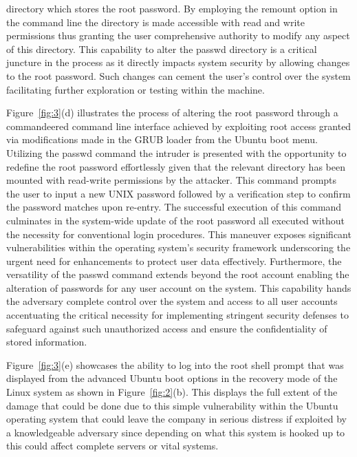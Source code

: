 \documentclass[manuscript,acmsmall,anonymous,review,screen,nonacm=true, authorversion=true]{acmart}
\begin{document}
directory which stores the root password. By employing the remount option in the
command line the directory is made accessible with read and write permissions thus granting the
user comprehensive authority to modify any aspect of this directory. This capability to alter
the passwd directory is a critical juncture in the process as it directly impacts system security by
allowing changes to the root password. Such changes can cement the user's control over the
system facilitating further exploration or testing within the machine.

Figure~\ref{fig:3}(d) illustrates the process of altering the root password through a commandeered
command line interface achieved by exploiting root access granted via modifications made in the
GRUB loader from the Ubuntu boot menu. Utilizing the passwd command the intruder is
presented with the opportunity to redefine the root password effortlessly given that the relevant
directory has been mounted with read-write permissions by the attacker. This command
prompts the user to input a new UNIX password followed by a verification step to confirm the
password matches upon re-entry. The successful execution of this command culminates in
the system-wide update of the root password all executed without the necessity for conventional
login procedures. This maneuver exposes significant vulnerabilities within the operating
system's security framework underscoring the urgent need for enhancements to protect user data
effectively. Furthermore, the versatility of the passwd command extends beyond the root
account enabling the alteration of passwords for any user account on the system. This
capability hands the adversary complete control over the system and access to all user accounts
accentuating the critical necessity for implementing stringent security defenses to safeguard
against such unauthorized access and ensure the confidentiality of stored information.

Figure~\ref{fig:3}(e) showcases the ability to log into the root shell prompt that was displayed from
the advanced Ubuntu boot options in the recovery mode of the Linux system as shown in Figure~\ref{fig:2}(b). This displays the full extent of the damage that could be done due to this simple
vulnerability within the Ubuntu operating system that could leave the company in serious
distress if exploited by a knowledgeable adversary since depending on what this system is
hooked up to this could affect complete servers or vital systems.
\end{document}
